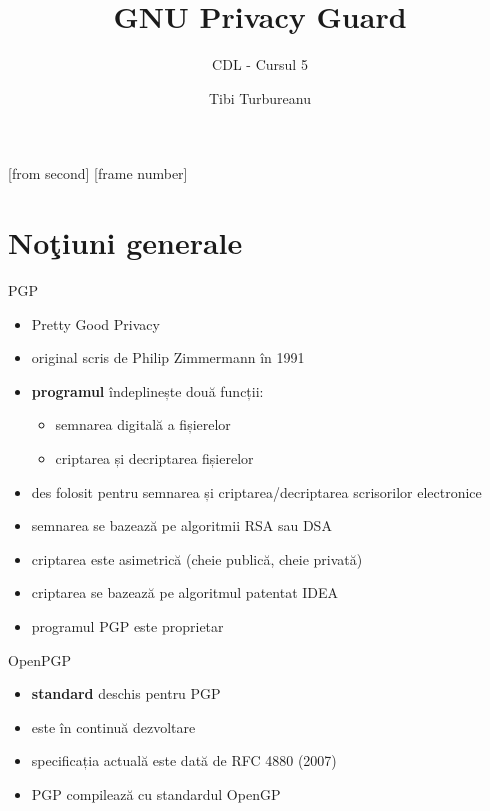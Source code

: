 \documentclass{beamer}
\title[GNU Privacy Guard]{GNU Privacy Guard}
\subtitle{CDL - Cursul 5}
\institute{Ceata}
\author{Tibi Turbureanu}
\begin{document}
[from second]
[frame number]

\frame{\titlepage}

\frame{\tableofcontents}

\section{No\c{t}iuni generale}

\frame{\tableofcontents[currentsection]}

\begin{frame}{PGP}
  \begin{itemize}
    \item Pretty Good Privacy
    \item original scris de Philip Zimmermann în 1991
    \item \textbf{programul} îndeplinește două funcții: 
    \begin{itemize}
      \item semnarea digitală a fișierelor
      \item criptarea și decriptarea fișierelor
    \end{itemize} 
    \item des folosit pentru semnarea și criptarea/decriptarea scrisorilor
    electronice
    \item semnarea se bazează pe algoritmii RSA sau DSA
    \item criptarea este asimetrică (cheie publică, cheie privată)
    \item criptarea se bazează pe algoritmul patentat IDEA
    \item programul PGP este proprietar
  \end{itemize}
\end{frame}

\begin{frame}{OpenPGP}
  \begin{itemize}
    \item \textbf{standard} deschis pentru PGP
    \item este în continuă dezvoltare
    \item specificația actuală este dată de RFC 4880 (2007)
    \item PGP compilează cu standardul OpenGP
  \end{itemize}
\end{frame}
\end{document}
